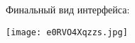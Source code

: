 \documentclass[a4paper,12pt]{article}
\begin{document}
Финальный вид интерфейса:
\begin{center}
    \texttt{[image: e0RVO4Xqzzs.jpg]}
\end{center}



\newpage
\appendix

\end{document}

